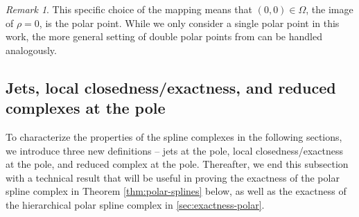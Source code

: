 \documentclass[10pt]{article}
\newcommand{\cV}{\rho}
\newcommand{\polarDomain}{\Omega}
\theoremstyle{plain}
\theoremstyle{definition}
\theoremstyle{remark}
\newtheorem{remark}{Remark}[section]
\begin{document}
\begin{remark}
    This specific choice of the mapping means that $(0,0) \in \polarDomain$, the image of $\cV = 0$, is the polar point.
    While we only consider a single polar point in this work, the more general setting of double polar points from \cite{Toshniwal:2021} can be handled analogously.
\end{remark}

\subsection{Jets, local closedness/exactness, and reduced complexes at the pole}

To characterize the properties of the spline complexes in the following sections, we introduce three new definitions -- jets at the pole, local closedness/exactness at the pole, and reduced complex at the pole.
Thereafter, we end this subsection with a technical result that will be useful in proving the exactness of the polar spline complex in Theorem \ref{thm:polar-splines} below, as well as the exactness of the hierarchical polar spline complex in \cref{sec:exactness-polar}.
\end{document}
